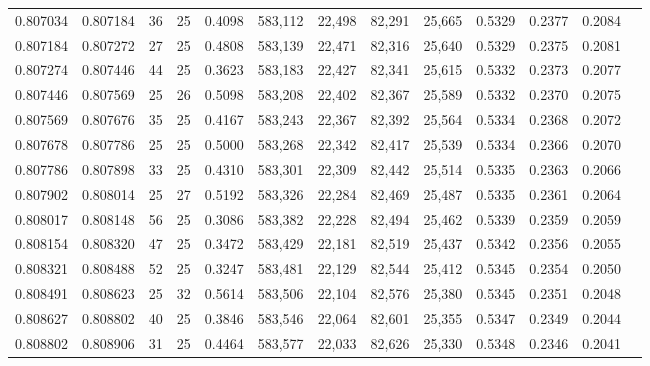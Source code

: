 \begin{tabular}{rrrrrrrrrrrrr}
0.807034 & 0.807184 &    36 &  25 &                                     0.4098 & 583,112 &  22,498 &  82,291 &  25,665 & 0.5329 & 0.2377 & 0.2084 \\
0.807184 & 0.807272 &    27 &  25 &                                     0.4808 & 583,139 &  22,471 &  82,316 &  25,640 & 0.5329 & 0.2375 & 0.2081 \\
0.807274 & 0.807446 &    44 &  25 &                                     0.3623 & 583,183 &  22,427 &  82,341 &  25,615 & 0.5332 & 0.2373 & 0.2077 \\
0.807446 & 0.807569 &    25 &  26 &                                     0.5098 & 583,208 &  22,402 &  82,367 &  25,589 & 0.5332 & 0.2370 & 0.2075 \\
0.807569 & 0.807676 &    35 &  25 &                                     0.4167 & 583,243 &  22,367 &  82,392 &  25,564 & 0.5334 & 0.2368 & 0.2072 \\
0.807678 & 0.807786 &    25 &  25 &                                     0.5000 & 583,268 &  22,342 &  82,417 &  25,539 & 0.5334 & 0.2366 & 0.2070 \\
0.807786 & 0.807898 &    33 &  25 &                                     0.4310 & 583,301 &  22,309 &  82,442 &  25,514 & 0.5335 & 0.2363 & 0.2066 \\
0.807902 & 0.808014 &    25 &  27 &                                     0.5192 & 583,326 &  22,284 &  82,469 &  25,487 & 0.5335 & 0.2361 & 0.2064 \\
0.808017 & 0.808148 &    56 &  25 &                                     0.3086 & 583,382 &  22,228 &  82,494 &  25,462 & 0.5339 & 0.2359 & 0.2059 \\
0.808154 & 0.808320 &    47 &  25 &                                     0.3472 & 583,429 &  22,181 &  82,519 &  25,437 & 0.5342 & 0.2356 & 0.2055 \\
0.808321 & 0.808488 &    52 &  25 &                                     0.3247 & 583,481 &  22,129 &  82,544 &  25,412 & 0.5345 & 0.2354 & 0.2050 \\
0.808491 & 0.808623 &    25 &  32 &                                     0.5614 & 583,506 &  22,104 &  82,576 &  25,380 & 0.5345 & 0.2351 & 0.2048 \\
0.808627 & 0.808802 &    40 &  25 &                                     0.3846 & 583,546 &  22,064 &  82,601 &  25,355 & 0.5347 & 0.2349 & 0.2044 \\
0.808802 & 0.808906 &    31 &  25 &                                     0.4464 & 583,577 &  22,033 &  82,626 &  25,330 & 0.5348 & 0.2346 & 0.2041 \\

\end{tabular}
